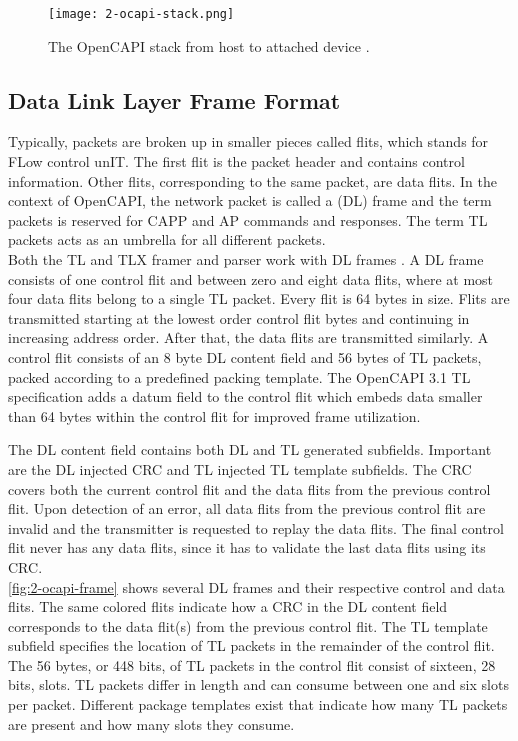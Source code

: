 \begin{figure}[h]
  \centering
  \texttt{[image: 2-ocapi-stack.png]}
  \caption{The OpenCAPI stack from host to attached device \cite{opencapi-enablement}.}
  \label{fig:2-ocapi-stack}
\end{figure}



\subsection{Data Link Layer Frame Format}
\label{sec:frame}
Typically, packets are broken up in smaller pieces called flits, which stands for FLow control unIT. The first flit is the packet header and contains control information. Other flits, corresponding to the same packet, are data flits. In the context of OpenCAPI, the network packet is called a (DL) frame and the term packets is reserved for CAPP and AP commands and responses. The term TL packets acts as an umbrella for all different packets.\\
Both the TL and TLX framer and parser work with DL frames \cite{ocapi-dl}. A DL frame consists of one control flit and between zero and eight data flits, where at most four data flits belong to a single TL packet. Every flit is 64 bytes in size. Flits are transmitted starting at the lowest order control flit bytes and continuing in increasing address order. After that, the data flits are transmitted similarly. A control flit consists of an 8 byte DL content field and 56 bytes of TL packets, packed according to a predefined packing template. The OpenCAPI 3.1 TL specification \cite{ocapi-tl} adds a datum field to the control flit which embeds data smaller than 64 bytes within the control flit for improved frame utilization.

The DL content field contains both DL and TL generated subfields. Important are the DL injected CRC and TL injected TL template subfields. The CRC covers both the current control flit and the data flits from the previous control flit. Upon detection of an error, all data flits from the previous control flit are invalid and the transmitter is requested to replay the data flits. The final control flit never has any data flits, since it has to validate the last data flits using its CRC.\\
\autoref{fig:2-ocapi-frame} shows several DL frames and their respective control and data flits. The same colored flits indicate how a CRC in the DL content field corresponds to the data flit(s) from the previous control flit. The TL template subfield specifies the location of TL packets in the remainder of the control flit. The 56 bytes, or 448 bits, of TL packets in the control flit consist of sixteen, 28 bits, slots. TL packets differ in length and can consume between one and six slots per packet. Different package templates exist that indicate how many TL packets are present and how many slots they consume.

